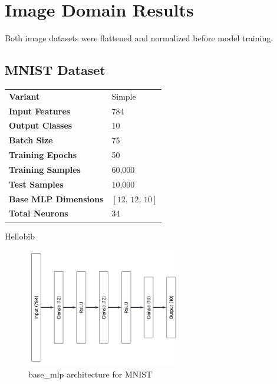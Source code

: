 
\section{Image Domain Results}

Both image datasets were flattened and normalized before model training.

\subsection{MNIST Dataset}

\begin{tabular}{@{}ll@{}}
\textbf{Variant} & Simple \\
\textbf{Input Features} & 784 \\
\textbf{Output Classes} & 10 \\
\textbf{Batch Size} & 75 \\
\textbf{Training Epochs} & 50 \\
\textbf{Training Samples} & 60,000 \\
\textbf{Test Samples} & 10,000 \\
\textbf{Base MLP Dimensions} & $[12,\, 12,\, 10]$ \\
\textbf{Total Neurons} & 34 \\
\end{tabular}

Hellobib \cite{pwc_mnist_leaderboard}

\begin{figure}[H]
    \centering
    \includegraphics[width=0.6\textwidth]{Figures/Results/MNIST/MNIST_base_mlp_architecture.png} 
    \captionsetup{justification=centering}  %
    \caption{base\_mlp architecture for MNIST}
    \label{fig:mnistMlpBaseArch}
\end{figure}

